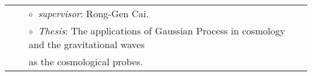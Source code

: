 \documentclass[letterpaper]{moderncv}  %
\begin{document}
\vspace{0.2cm}
\vspace{-0.1cm}
\begin{tabular}{rcl}
&\hspace{0.4cm} &$\circ\;\;${\textit{supervisor}}: Rong-Gen Cai.\\
&\hspace{0.4cm} &$\circ\;\;${\textit{Thesis}}: The applications of Gaussian Process in cosmology and the gravitational waves \\&\hspace{0.4cm} & 
\hspace{0.4cm}as the cosmological probes.
\end{tabular}

\end{document}
